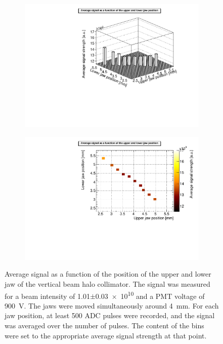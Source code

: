 \begin{figure}
\begin{subfigure}[b]{0.5\textwidth}
\includegraphics[width=\textwidth]{Figures/AsymmetricScan_4mm_beamintensity101_lego.pdf}
\end{subfigure}
\begin{subfigure}[b]{0.5\textwidth}
\includegraphics[width=\textwidth]{Figures/AsymmetricScan_4mm_beamintensity101_colz.pdf}
\end{subfigure}
\caption[RHUL Cherenkov detector signal for certain upper/lower jaw positions around \SI{4}{\milli\metre}, for a beam intensity of \num{1.01}$\pm$\num{0.03e10}]{Average signal as a function of the position of the upper and lower jaw of the vertical beam halo collimator. The signal was measured for a beam intensity of \num{1.01}$\pm$\num{0.03e10} and a PMT voltage of \SI{900}{\volt}. The jaws were moved simultaneously around \SI{4}{\milli\metre}. For each jaw position, at least 500 ADC pulses were recorded, and the signal was averaged over the number of pulses. The content of the bins were set to the appropriate average signal strength at that point.}
\label{fig:AverageSignal_Asymmetric_4mm_101}
\end{figure}
